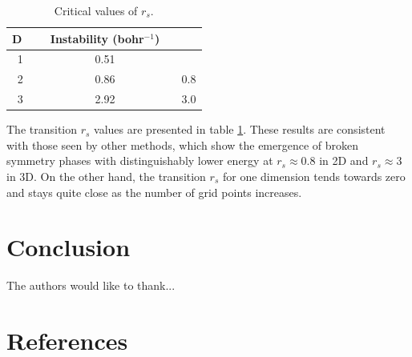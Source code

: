 \documentclass[preprint, journal=prl]{revtex4-1}
\begin{document}
  
  \begin{table}[H]
  \centering
  \caption{Critical values of $r_s$.}
    \begin{tabular}{ c  c  c }
      D~ & ~ Instability (bohr$^{-1}$) ~ &  \\ 
      \hline
      1    &  0.51 &  \\
      2    &  0.86 & 0.8 \\
      3    &  2.92 & 3.0 \\
      \hline
     \end{tabular}
  \label{table:transition_rs}
  \end{table}  
  The transition $r_s$ values are presented in table \ref{table:transition_rs}. These results are consistent with those seen by other methods, which show the emergence of broken symmetry phases with distinguishably lower energy at $r_s \approx 0.8$ in 2D and $r_s \approx 3$ in 3D\cite{Baguet2014, Bernu2011}. On the other hand, the transition $r_s$ for one dimension tends towards zero and stays quite close as the number of grid points increases. 

  
\section{Conclusion}
  

  
\begin{acknowledgements}
The authors would like to thank...
\end{acknowledgements}

\section{References}

\end{document}
